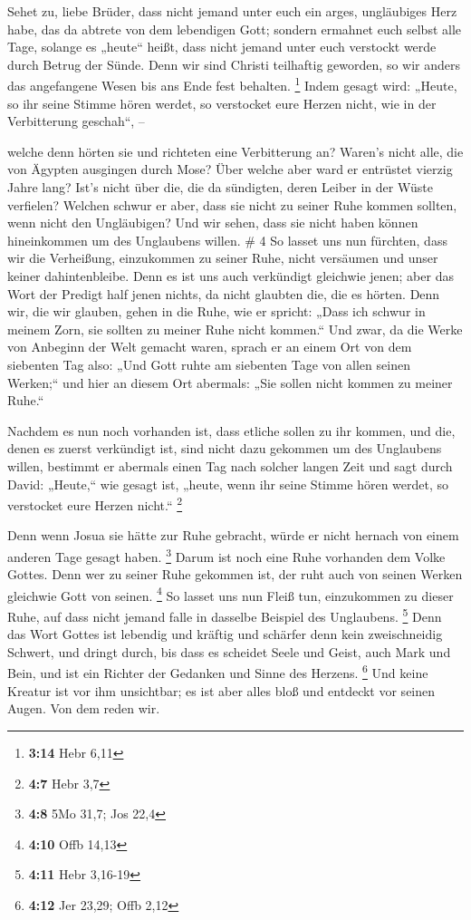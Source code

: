  Sehet zu, liebe Brüder, dass nicht jemand unter euch ein
arges, ungläubiges Herz habe, das da abtrete von dem lebendigen Gott;
 sondern ermahnet euch selbst alle Tage, solange es
„heute`` heißt, dass nicht jemand unter euch verstockt werde durch
Betrug der Sünde.  Denn wir sind Christi teilhaftig
geworden, so wir anders das angefangene Wesen bis ans Ende fest
behalten. \footnote{\textbf{3:14} Hebr 6,11}  Indem
gesagt wird: „Heute, so ihr seine Stimme hören werdet, so verstocket
eure Herzen nicht, wie in der Verbitterung geschah``, --

 welche denn hörten sie und richteten eine Verbitterung
an? Waren's nicht alle, die von Ägypten ausgingen durch Mose?
 Über welche aber ward er entrüstet vierzig Jahre lang?
Ist's nicht über die, die da sündigten, deren Leiber in der Wüste
verfielen?  Welchen schwur er aber, dass sie nicht zu
seiner Ruhe kommen sollten, wenn nicht den Ungläubigen? 
Und wir sehen, dass sie nicht haben können hineinkommen um des
Unglaubens willen. \# 4  So lasset uns nun fürchten, dass
wir die Verheißung, einzukommen zu seiner Ruhe, nicht versäumen und
unser keiner dahintenbleibe.  Denn es ist uns auch
verkündigt gleichwie jenen; aber das Wort der Predigt half jenen nichts,
da nicht glaubten die, die es hörten.  Denn wir, die wir
glauben, gehen in die Ruhe, wie er spricht: „Dass ich schwur in meinem
Zorn, sie sollten zu meiner Ruhe nicht kommen.`` Und zwar, da die Werke
von Anbeginn der Welt gemacht waren,  sprach er an einem
Ort von dem siebenten Tag also: „Und Gott ruhte am siebenten Tage von
allen seinen Werken;``  und hier an diesem Ort abermals:
„Sie sollen nicht kommen zu meiner Ruhe.``

 Nachdem es nun noch vorhanden ist, dass etliche sollen zu
ihr kommen, und die, denen es zuerst verkündigt ist, sind nicht dazu
gekommen um des Unglaubens willen,  bestimmt er abermals
einen Tag nach solcher langen Zeit und sagt durch David: „Heute,`` wie
gesagt ist, „heute, wenn ihr seine Stimme hören werdet, so verstocket
eure Herzen nicht.`` \footnote{\textbf{4:7} Hebr 3,7}

 Denn wenn Josua sie hätte zur Ruhe gebracht, würde er
nicht hernach von einem anderen Tage gesagt haben. \footnote{\textbf{4:8}
  5Mo 31,7; Jos 22,4}  Darum ist noch eine Ruhe vorhanden
dem Volke Gottes.  Denn wer zu seiner Ruhe gekommen ist,
der ruht auch von seinen Werken gleichwie Gott von seinen. \footnote{\textbf{4:10}
  Offb 14,13}  So lasset uns nun Fleiß tun, einzukommen
zu dieser Ruhe, auf dass nicht jemand falle in dasselbe Beispiel des
Unglaubens. \footnote{\textbf{4:11} Hebr 3,16-19}  Denn
das Wort Gottes ist lebendig und kräftig und schärfer denn kein
zweischneidig Schwert, und dringt durch, bis dass es scheidet Seele und
Geist, auch Mark und Bein, und ist ein Richter der Gedanken und Sinne
des Herzens. \footnote{\textbf{4:12} Jer 23,29; Offb 2,12}
 Und keine Kreatur ist vor ihm unsichtbar; es ist aber
alles bloß und entdeckt vor seinen Augen. Von dem reden wir.

